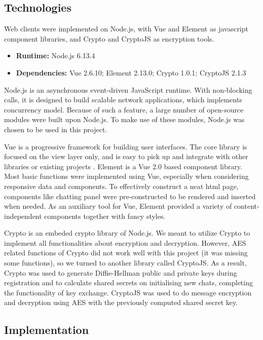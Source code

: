 
\subsection{Technologies}

Web clients were implemented on Node.js, with Vue and Element as javascript component libraries, and Crypto and CryptoJS as encryption tools.

\begin{itemize}
    \item \textbf{Runtime:} Node.js 6.13.4
    \item \textbf{Dependencies:} Vue 2.6.10; Element 2.13.0; Crypto 1.0.1; CryptoJS 2.1.3
\end{itemize}

Node.js is an asynchronous event-driven JavaScript runtime. With non-blocking calls, it is designed to build scalable network applications, which implements concurrency model\cite{nodejs}\cite{non-blocking}. Because of such a feature, a large number of open-source modules were built upon Node.js. To make use of these modules, Node.js was chosen to be used in this project.

Vue is a progressive framework for building user interfaces. The core library is focused on the view layer only, and is easy to pick up and integrate with other libraries or existing projects \cite{vue}. Element is a Vue 2.0 based component library. Most basic functions were implemented using Vue, especially when considering responsive data and components. To effectively construct a neat html page, components like chatting panel were pre-constructed to be rendered and inserted when needed. As an auxiliary tool for Vue, Element provided a variety of content-independent components together with fancy styles.

Crypto is an embeded crypto library of Node.js. We meant to utilize Crypto to implement all functionalities about encryption and decryption. However, AES related functions of Crypto did not work well with this project (it was missing some functions), so we turned to another library called CryptoJS. As a result, Crypto was used to generate Diffie-Hellman public and private keys during registration and to calculate shared secrets on initialising new chats, completing the functionality of key exchange. CryptoJS was used to do message encryption and decryption using AES with the previously computed shared secret key.


\subsection{Implementation}

